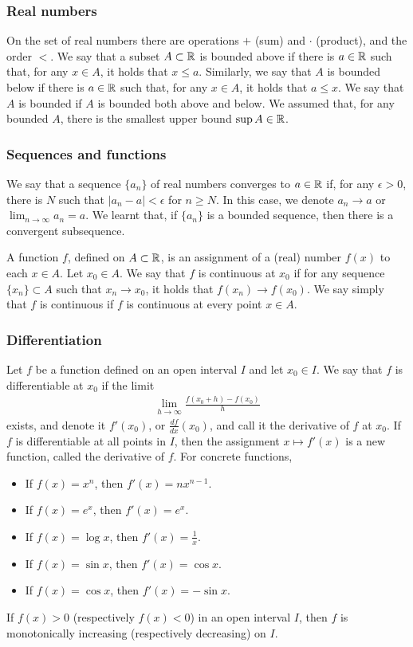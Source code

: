 \subsubsection*{Real numbers}
On the set of real numbers there are operations $+$ (sum) and $\cdot$ (product), and the order $<$.
We say that a subset $A \subset \mathbb{R}$ is bounded above if there is $a \in \mathbb{R}$ such that,
for any $x \in A$, it holds that $x \le a$. Similarly, we say that $A$ is bounded below if there is $a \in \mathbb{R}$
such that, for any $x \in A$, it holds that $a \le x$. We say that $A$ is bounded if $A$ is bounded both above and below.
We assumed that, for any bounded $A$, there is the smallest upper bound $\sup A \in \mathbb{R}$.

\subsubsection*{Sequences and functions}

We say that a sequence $\{a_n\}$ of real numbers converges to $a \in \mathbb{R}$ if, for any $\epsilon > 0$,
there is $N$ such that $|a_n - a| < \epsilon$ for $n \ge N$. In this case, we denote $a_n \to a$ or $\lim_{n\to \infty}a_n = a$.
We learnt that, if $\{a_n\}$ is a bounded sequence, then there is a convergent subsequence.

A function $f$, defined on $A \subset \mathbb{R}$, is an assignment of a (real) number $f(x)$ to each $x \in A$.
Let $x_0 \in A$. We say that $f$ is continuous at $x_0$ if for any sequence $\{x_n\} \subset A$ such that $x_n \to x_0$,
it holds that $f(x_n) \to f(x_0)$. We say simply that $f$ is continuous if $f$ is continuous at every point $x \in A$.

\subsubsection*{Differentiation}

Let $f$ be a function defined on an open interval $I$ and let $x_0 \in I$.
We say that $f$ is differentiable at $x_0$ if the limit
\begin{align*}
 \lim_{h\to \infty} \frac{f(x_0 + h) - f(x_0)}h
\end{align*}
exists, and denote it $f'(x_0)$, or $\frac{df}{dx}(x_0)$, and call it the derivative of $f$ at $x_0$.
If $f$ is differentiable at all points in $I$, then the assignment $x \mapsto f'(x)$ is a new function,
called the derivative of $f$. For concrete functions,
\begin{itemize}
 \item If $f(x) = x^n$, then $f'(x) = nx^{n-1}$.
 \item If $f(x) = e^x$, then $f'(x) = e^x$.
 \item If $f(x) = \log x$, then $f'(x) = \frac1x$.
 \item If $f(x) = \sin x$, then $f'(x) = \cos x$.
 \item If $f(x) = \cos x$, then $f'(x) = -\sin x$.
\end{itemize}
If $f(x) > 0$ (respectively $f(x) < 0$) in an open interval $I$, then $f$ is monotonically increasing (respectively decreasing) on $I$.

